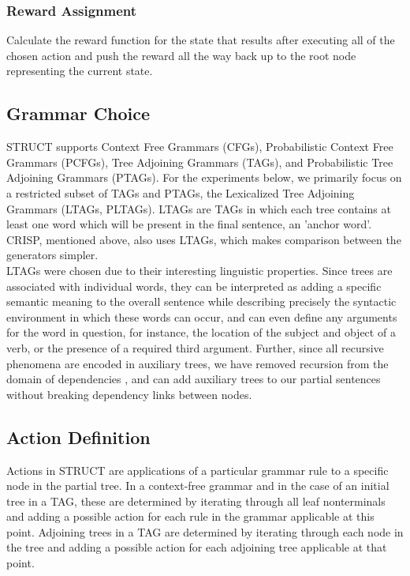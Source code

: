 \subsubsection{Reward Assignment}
Calculate the reward function for the state that results after executing all of the chosen action and push the reward
all the way back up to the root node representing the current state.

\subsection{Grammar Choice}

STRUCT supports Context Free Grammars (CFGs), Probabilistic Context Free Grammars (PCFGs), Tree Adjoining Grammars
(TAGs), and Probabilistic Tree Adjoining Grammars (PTAGs). For the experiments below, we primarily focus on a restricted
subset of TAGs and PTAGs, the Lexicalized Tree Adjoining Grammars (LTAGs, PLTAGs). LTAGs are TAGs in which each tree
contains at least one word which will be present in the final sentence, an 'anchor word'. CRISP, mentioned above, also
uses LTAGs, which makes comparison between the generators simpler.\\

LTAGs were chosen due to their interesting linguistic properties. Since trees are associated with individual words, they
can be interpreted as adding a specific semantic meaning to the overall sentence while describing precisely the
syntactic environment in which these words can occur, and can even define any arguments for the word in question, for
instance, the location of the subject and object of a verb, or the presence of a required third argument. Further, since
all recursive phenomena are encoded in auxiliary trees, we have removed recursion from the domain of dependencies
\cite{bauer2009statistical}, and can add auxiliary trees to our partial sentences without breaking dependency links
between nodes.

\subsection{Action Definition}

Actions in STRUCT are applications of a particular grammar rule to a specific node in the partial tree. In a
context-free grammar and in the case of an initial tree in a TAG, these are determined by iterating through all leaf
nonterminals and adding a possible action for each rule in the grammar applicable at this point. Adjoining trees in a
TAG are determined by iterating through each node in the tree and adding a possible action for each adjoining tree
applicable at that point.\\

